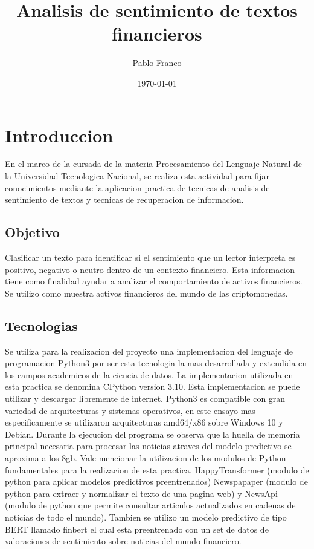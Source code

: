 \documentclass[12pt,jou]{apa7}
\title{Analisis de sentimiento de textos financieros}
\author{Pablo Franco}
\affiliation{Universidad Tecnologica Ncional}
\date{\today}
\begin{document}
\maketitle
\section{Introduccion}\label{sec:introduccion}
En el marco de la cursada de la materia Procesamiento del
Lenguaje Natural de la Universidad Tecnologica Nacional,
se realiza esta actividad para fijar conocimientos
mediante la aplicacion practica de tecnicas de analisis de
sentimiento de textos y tecnicas de recuperacion de informacion.
\subsection{Objetivo}\label{subsec:objetivo}
Clasificar un texto para identificar si el sentimiento
que un lector interpreta es positivo, negativo o neutro
dentro de un contexto financiero.
Esta informacion tiene como finalidad ayudar a
analizar el comportamiento de activos financieros.
Se utilizo como muestra activos financieros del mundo de las
criptomonedas.
\subsection{Tecnologias}\label{subsec:tecnologias}
Se utiliza para la realizacion del proyecto una implementacion
del lenguaje de programacion Python3\cite{cite_01} por ser esta tecnologia
la mas desarrollada y extendida en los campos academicos de la ciencia de datos.
La implementacion utilizada en esta practica se denomina CPython version 3.10.
Esta implementacion se puede utilizar y descargar libremente de internet.
Python3 es compatible con gran variedad de arquitecturas y sistemas operativos,
en este ensayo mas especificamente se utilizaron arquitecturas amd64/x86 sobre Windows 10 y Debian.
Durante la ejecucion del programa se observa que la huella de memoria principal necesaria
para procesar las noticias atraves del modelo predictivo se aproxima a los 8gb.
Vale mencionar la utilizacion de los modulos de Python fundamentales para la
realizacion de esta practica, HappyTransformer\cite{cite_02} (modulo de python para aplicar modelos
predictivos preentrenados)
Newspapaper\cite{cite_03} (modulo de python para extraer y normalizar el texto de una pagina web) y
NewsApi\cite{cite_04} (modulo de python que permite consultar articulos actualizados en cadenas
de noticias de todo el mundo).
Tambien se utilizo un modelo predictivo de tipo BERT llamado finbert\cite{cite_05}
el cual esta preentrenado con un set de datos de valoraciones de sentimiento
sobre noticias del mundo financiero.
\end{document}
